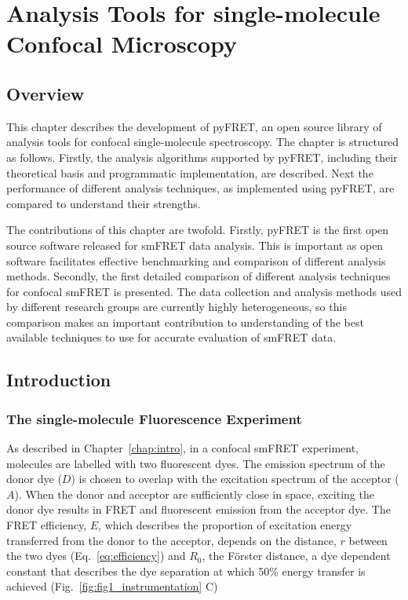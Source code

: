 \chapter{Analysis Tools for single-molecule Confocal Microscopy}
\label{chap:pyfret}
\section{Overview}
This chapter describes the development of pyFRET, an open source library of analysis tools for confocal single-molecule spectroscopy. The chapter is structured as follows. Firstly, the analysis algorithms supported by pyFRET, including their theoretical basis and programmatic implementation, are described. Next the performance of different analysis techniques, as implemented using pyFRET, are compared to understand their strengths. 

The contributions of this chapter are twofold. Firstly, pyFRET is the first open source software released for smFRET data analysis. This is important as open software facilitates effective benchmarking and comparison of different analysis methods. Secondly, the first detailed comparison of different analysis techniques for confocal smFRET is presented. The data collection and analysis methods used by different research groups are currently highly heterogeneous, so this comparison makes an important contribution to understanding of the best available techniques to use for accurate evaluation of smFRET data.  

\section{Introduction}
\subsection{The single-molecule Fluorescence Experiment}

As described in Chapter~\ref{chap:intro}, in a confocal smFRET experiment, molecules are labelled with two fluorescent dyes. The emission spectrum of the donor dye ($D$) is chosen to overlap with the excitation spectrum of the acceptor ($A$). When the donor and acceptor are sufficiently close in space, exciting the donor dye results in FRET and fluorescent emission from the acceptor dye. The FRET efficiency, $E$, which describes the proportion of excitation energy transferred from the donor to the acceptor, depends on the distance, $r$ between the two dyes (Eq.~\ref{eq:efficiency}) and $R_0$, the F\"{o}rster distance, a dye dependent constant that describes the dye separation at which 50\% energy transfer is achieved (Fig.~\ref{fig:fig1_instrumentation} C)


